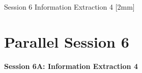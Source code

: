 \clearpage
{}
\begin{ThreeSessionOverview}{Session 6}{\daydateyear}
  {Information Extraction 4}
  [2mm]
  \\
\end{ThreeSessionOverview}

\newpage
\section*{Parallel Session 6}
{\bfseries\large Session 6A: Information Extraction 4}\\
\TrackALoc\hfill\sessionchair{}{}
\clearpage


